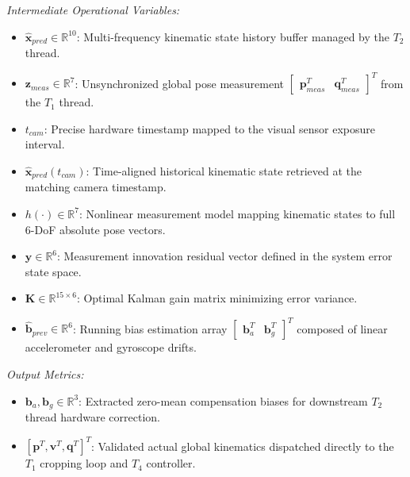 \documentclass{article}
\begin{document}
\noindent\textit{Intermediate Operational Variables:}
\begin{itemize}
    \item $\hat{\mathbf{x}}_{pred} \in \mathbb{R}^{10}$: Multi-frequency kinematic state history buffer managed by the $T_2$ thread.
    \item $\mathbf{z}_{meas} \in \mathbb{R}^7$: Unsynchronized global pose measurement $\begin{bmatrix} \mathbf{p}_{meas}^T & \mathbf{q}_{meas}^T \end{bmatrix}^T$ from the $T_1$ thread.
    \item $t_{cam}$: Precise hardware timestamp mapped to the visual sensor exposure interval.
    \item $\hat{\mathbf{x}}_{pred}(t_{cam})$: Time-aligned historical kinematic state retrieved at the matching camera timestamp.
    \item $h(\cdot) \in \mathbb{R}^7$: Nonlinear measurement model mapping kinematic states to full 6-DoF absolute pose vectors.
    \item $\mathbf{y} \in \mathbb{R}^6$: Measurement innovation residual vector defined in the system error state space.
    \item $\mathbf{K} \in \mathbb{R}^{15 \times 6}$: Optimal Kalman gain matrix minimizing error variance.
    \item $\hat{\mathbf{b}}_{prev} \in \mathbb{R}^6$: Running bias estimation array $\begin{bmatrix} \mathbf{b}_a^T & \mathbf{b}_g^T \end{bmatrix}^T$ composed of linear accelerometer and gyroscope drifts.
\end{itemize}

\noindent\textit{Output Metrics:}
\begin{itemize}
    \item $\mathbf{b}_a, \mathbf{b}_g \in \mathbb{R}^3$: Extracted zero-mean compensation biases for downstream $T_2$ thread hardware correction.
    \item $[\mathbf{p}^T, \mathbf{v}^T, \mathbf{q}^T]^T$: Validated actual global kinematics dispatched directly to the $T_1$ cropping loop and $T_4$ controller.
\end{itemize}

\vspace{10pt}
\end{document}
